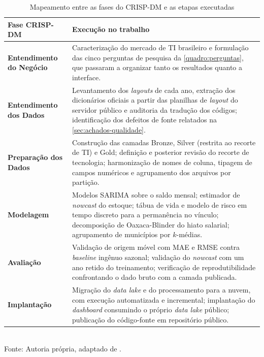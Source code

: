 \begin{table}[htbp]
    \centering
    \caption{Mapeamento entre as fases do CRISP-DM e as etapas executadas}
    \label{tab:crispdm-fases}
    \renewcommand{\arraystretch}{1.35}
    \begin{tabular}{p{4.2cm}p{9.8cm}}
        \toprule
        \rowcolor{black!8}
        \textbf{Fase CRISP-DM} & \textbf{Execução no trabalho} \\
        \midrule
        \textbf{Entendimento do Negócio}  & Caracterização do mercado de TI brasileiro e formulação das cinco perguntas de pesquisa da \autoref{quadro:perguntas}, que passaram a organizar tanto os resultados quanto a interface. \\
        \textbf{Entendimento dos Dados}   & Levantamento dos \textit{layouts} de cada ano, extração dos dicionários oficiais a partir das planilhas de \textit{layout} do servidor público e auditoria da tradução dos códigos; identificação dos defeitos de fonte relatados na \autoref{sec:achados-qualidade}. \\
        \textbf{Preparação dos Dados}     & Construção das camadas Bronze, Silver (restrita ao recorte de TI) e Gold; definição e posterior revisão do recorte de tecnologia; harmonização de nomes de coluna, tipagem de campos numéricos e agrupamento dos arquivos por partição. \\
        \textbf{Modelagem}                & Modelos SARIMA sobre o saldo mensal; estimador de \textit{nowcast} do estoque; tábua de vida e modelo de risco em tempo discreto para a permanência no vínculo; decomposição de Oaxaca-Blinder do hiato salarial; agrupamento de municípios por $k$-médias. \\
        \textbf{Avaliação}                & Validação de origem móvel com MAE e RMSE contra \textit{baseline} ingênuo sazonal; validação do \textit{nowcast} com um ano retido do treinamento; verificação de reprodutibilidade confrontando o dado bruto com a camada publicada. \\
        \textbf{Implantação}              & Migração do \textit{data lake} e do processamento para a nuvem, com execução automatizada e incremental; implantação do \textit{dashboard} consumindo o próprio \textit{data lake} público; publicação do código-fonte em repositório público. \\
        \bottomrule
    \end{tabular}
    \\[4pt]
    Fonte: Autoria própria, adaptado de .
\end{table}

